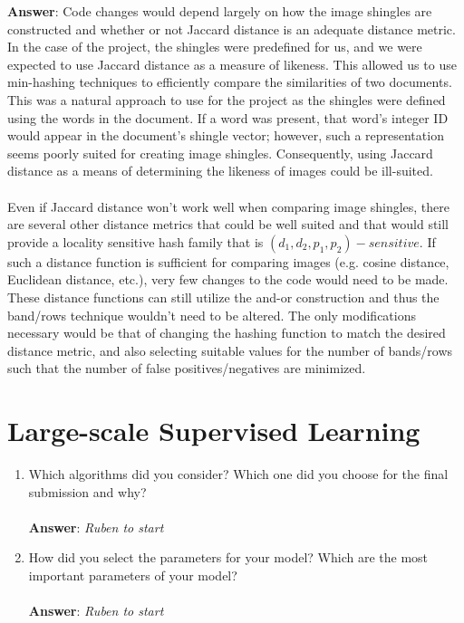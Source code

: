 \documentclass[11pt]{article}
\begin{document}
\begin{enumerate}
\textbf{Answer}: Code changes would depend largely on how the image shingles
are constructed and whether or not Jaccard distance is an adequate distance
metric. In the case of the project, the shingles were predefined for us, and we
were expected to use Jaccard distance as a measure of likeness.
This allowed us to use min-hashing techniques to efficiently compare the
similarities of two documents.  This was a natural approach to use for the
project as the shingles were defined using the words in the document.  If a
word was present, that word's integer ID would appear in the document's shingle
vector; however, such a representation seems poorly suited for creating image
shingles. Consequently, using Jaccard distance as a means of determining the
likeness of images could be ill-suited. \\ \\
Even if Jaccard distance won't work well when comparing image shingles, there
are several other distance metrics that could be well suited and that would
still provide a locality sensitive hash family that is 
$(d_1,d_2,p_1,p_2)-sensitive$. If such a distance function is sufficient for
comparing images (e.g. cosine distance, Euclidean distance, etc.), very few changes 
to the code would need to be made. These distance functions can still utilize 
the and-or construction and thus the band/rows technique wouldn't need to be
altered.  The only modifications necessary would be that of changing the hashing
function to match the desired distance metric, and also selecting suitable
values for the number of bands/rows such that the number of false
positives/negatives are minimized.


\end{enumerate}

\section{Large-scale Supervised Learning}

\begin{enumerate}
\item Which algorithms did you consider? Which one did you choose for the
  final submission and why? \\ \\
\textbf{Answer}: \emph{Ruben to start}

\item How did you select the parameters for your model? Which are the
  most important parameters of your model? \\ \\
\textbf{Answer}: \emph{Ruben to start}

\end{enumerate}
\end{document}
